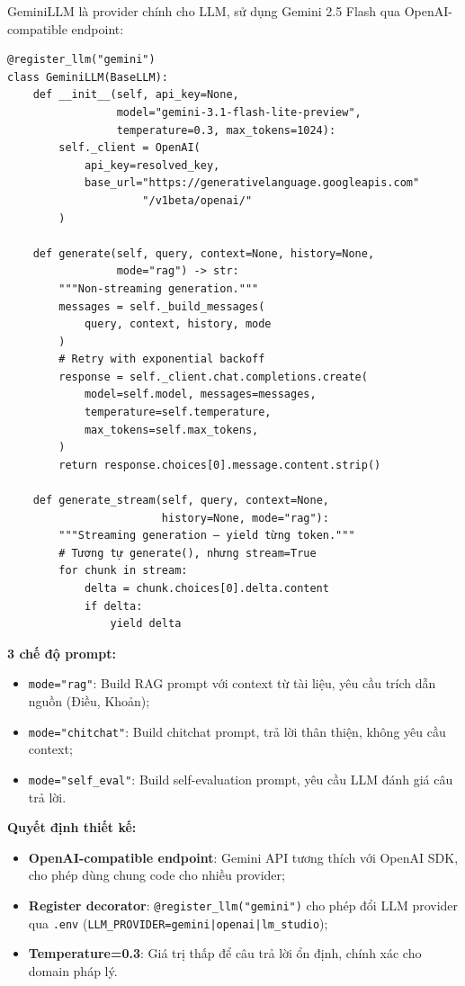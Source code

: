 \documentclass[../DoAn.tex]{subfiles}
\begin{document}
GeminiLLM là provider chính cho LLM, sử dụng Gemini 2.5 Flash qua OpenAI-compatible endpoint:
\begin{verbatim}
@register_llm("gemini")
class GeminiLLM(BaseLLM):
    def __init__(self, api_key=None,
                 model="gemini-3.1-flash-lite-preview",
                 temperature=0.3, max_tokens=1024):
        self._client = OpenAI(
            api_key=resolved_key,
            base_url="https://generativelanguage.googleapis.com"
                     "/v1beta/openai/"
        )

    def generate(self, query, context=None, history=None,
                 mode="rag") -> str:
        """Non-streaming generation."""
        messages = self._build_messages(
            query, context, history, mode
        )
        # Retry with exponential backoff
        response = self._client.chat.completions.create(
            model=self.model, messages=messages,
            temperature=self.temperature,
            max_tokens=self.max_tokens,
        )
        return response.choices[0].message.content.strip()

    def generate_stream(self, query, context=None,
                        history=None, mode="rag"):
        """Streaming generation — yield từng token."""
        # Tương tự generate(), nhưng stream=True
        for chunk in stream:
            delta = chunk.choices[0].delta.content
            if delta:
                yield delta
\end{verbatim}

\textbf{3 chế độ prompt:}
\begin{itemize}
    \item \texttt{mode="rag"}: Build RAG prompt với context từ tài liệu, yêu cầu trích dẫn nguồn (Điều, Khoản);
    \item \texttt{mode="chitchat"}: Build chitchat prompt, trả lời thân thiện, không yêu cầu context;
    \item \texttt{mode="self\_eval"}: Build self-evaluation prompt, yêu cầu LLM đánh giá câu trả lời.
\end{itemize}

\textbf{Quyết định thiết kế:}
\begin{itemize}
    \item \textbf{OpenAI-compatible endpoint}: Gemini API tương thích với OpenAI SDK, cho phép dùng chung code cho nhiều provider;
    \item \textbf{Register decorator}: \texttt{@register\_llm("gemini")} cho phép đổi LLM provider qua \texttt{.env} (\texttt{LLM\_PROVIDER=gemini|openai|lm\_studio});
    \item \textbf{Temperature=0.3}: Giá trị thấp để câu trả lời ổn định, chính xác cho domain pháp lý.
\end{itemize}
\end{document}

